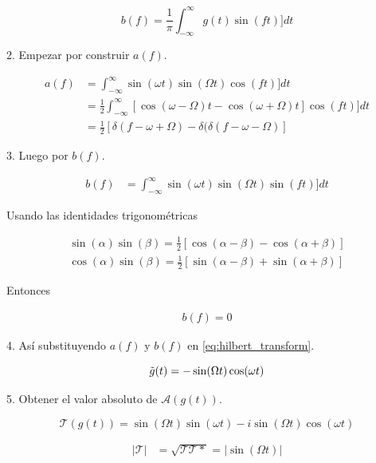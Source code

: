 \begin{equation}
b(f)=\frac{1}{\pi}\int_{-\infty}^{\infty} g(t)\sin(ft)]dt
\end{equation}

2. Empezar por construir $a(f)$.

\begin{align*}
a(f) &= \int_{-\infty}^{\infty} \sin(\omega t)\sin(\Omega t)\cos(ft)]dt \\
\quad &= \frac{1}{2}\int_{-\infty}^{\infty} [\cos(\omega-\Omega)t - \cos(\omega+\Omega)t]\cos(ft)]dt \\
\quad &= \frac{1}{2}[\delta(f-\omega+\Omega)-\delta(\delta(f-\omega-\Omega)]
\end{align*}

3. Luego por $b(f)$.

\begin{align*}
b(f) &= \int_{-\infty}^{\infty} \sin(\omega t)\sin(\Omega t)\sin(ft)]dt
\end{align*}

Usando las identidades trigonométricas

\begin{align*}
\sin(\alpha)\sin(\beta)=\frac{1}{2}[\cos(\alpha-\beta)-\cos(\alpha+\beta)] \\
\cos(\alpha)\sin(\beta)=\frac{1}{2}[\sin(\alpha-\beta)+\sin(\alpha+\beta)]
\end{align*}

Entonces

\begin{align*}
b(f) = 0
\end{align*}

4. Así substituyendo $a(f)$ y $b(f)$ en \ref{eq:hilbert_transform}.

\begin{equation}
\Tilde{g}(t)=-\sin(\Omega t)\cos(\omega t)
\end{equation}

5. Obtener el valor absoluto de $\mathscr{A}(g(t))$.

\begin{equation}
\mathcal{T}(g(t))=\sin(\Omega t)\sin(\omega t)-i\sin(\Omega t)\cos(\omega t)
\end{equation}

\begin{align*}
|\mathcal{T}| &= \sqrt{\mathcal{T}\mathcal{T}*} = |\sin(\Omega t)|
\end{align*}

